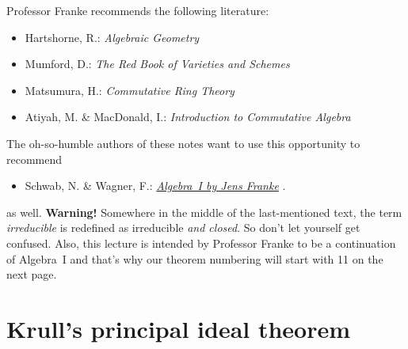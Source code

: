 \documentclass[a4paper,parskip=half,numbers=enddot, DIV=12]{scrreprt}
\begin{document}
Professor Franke recommends the following literature:
\begin{itemize}
	\item Hartshorne, R.: \emph{Algebraic Geometry}
	\item Mumford, D.: \emph{The Red Book of Varieties and Schemes}
	\item Matsumura, H.: \emph{Commutative Ring Theory} \cite{matsumuraCRT}
	\item Atiyah, M. \& MacDonald, I.: \emph{Introduction to Commutative Algebra}
\end{itemize}
The oh-so-humble authors of these notes want to use this opportunity to recommend
\begin{itemize}
	\item Schwab, N. \& Wagner, F.:  \href{https://github.com/Nicholas42/AlgebraFranke/tree/master/AlgebraI}{\emph{Algebra~I by Jens Franke}} \cite{alg1}.
\end{itemize}
as well. \textbf{Warning!} Somewhere in the middle of the last-mentioned text, the term \emph{irreducible} is redefined as irreducible \emph{and closed}. So don't let yourself get confused. Also, this lecture is intended by Professor Franke to be a continuation of Algebra~I and that's why our theorem numbering will start with 11 on the next page. 

\chapter{Krull's principal ideal theorem}
\end{document}
